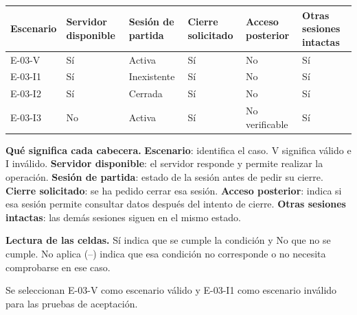 \begingroup\fontsize{7.8}{11}\selectfont\setlength{\tabcolsep}{3pt}
\begin{tabularx}{\linewidth}{@{}*{6}{Y}@{}}\toprule
\textbf{Escenario} & \textbf{Servidor disponible} & \textbf{Sesión de partida} & \textbf{Cierre solicitado} & \textbf{Acceso posterior} & \textbf{Otras sesiones intactas}\\\midrule
E-03-V & Sí & Activa & Sí & No & Sí\\[3pt]
E-03-I1 & Sí & Inexistente & Sí & No & Sí\\[3pt]
E-03-I2 & Sí & Cerrada & Sí & No & Sí\\[3pt]
E-03-I3 & No & Activa & Sí & No verificable & Sí\\[3pt]
\bottomrule\end{tabularx}\endgroup\par
{\fontsize{9}{11}\selectfont\textbf{Qué significa cada cabecera.} \textbf{Escenario}: identifica el caso. V significa válido e I inválido. \textbf{Servidor disponible}: el servidor responde y permite realizar la operación. \textbf{Sesión de partida}: estado de la sesión antes de pedir su cierre. \textbf{Cierre solicitado}: se ha pedido cerrar esa sesión. \textbf{Acceso posterior}: indica si esa sesión permite consultar datos después del intento de cierre. \textbf{Otras sesiones intactas}: las demás sesiones siguen en el mismo estado.\par\textbf{Lectura de las celdas.} Sí indica que se cumple la condición y No que no se cumple. No aplica (--) indica que esa condición no corresponde o no necesita comprobarse en ese caso.\par}


Se seleccionan E-03-V como escenario válido y E-03-I1 como escenario inválido para las pruebas de aceptación.\par


